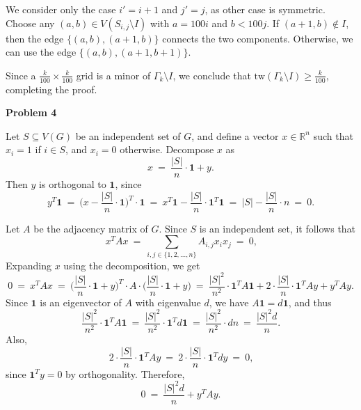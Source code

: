 \documentclass[12pt]{article}
\begin{document}
	We consider only the case \(i' = i + 1\) and \(j' = j\), as other case is
	symmetric. Choose any \((a, b) \in V(S_{i, j} \setminus I)\) with \(a = 100
	i\) and \(b < 100 j\). If \((a + 1, b) \notin I\), then the edge \(\{(a, b),
	(a + 1, b)\}\) connects the two components. Otherwise, we can use the edge
	\(\{(a, b), (a + 1, b + 1)\}\).
	
	\medskip
	
	Since a \(\frac{k}{100} \times \frac{k}{100}\) grid is a minor of
	\(\Gamma_{k} \setminus I\), we conclude that \(\mathrm{tw}(\Gamma_{k}
	\setminus I) \geqslant \frac{k}{100}\), completing the proof.
	
	\bigskip
	
	\textbf{Problem 4}
	
	\medskip
	
	Let \(S \subseteq V(G)\) be an independent set of \(G\), and define a vector
	\(x \in \mathbb{R}^{n}\) such that \(x_{i} = 1\) if \(i \in S\), and \(x_{i}
	= 0\) otherwise. Decompose \(x\) as
	\[
		x \ = \ \frac{|S|}{n} \cdot \mathbf{1} + y \text{.}
	\]
	Then \(y\) is orthogonal to \(\mathbf{1}\), since
	\[
		y^{T} \mathbf{1} \ = \ \bigg( x - \frac{|S|}{n} \cdot \mathbf{1}
		\bigg)^{T} \cdot \mathbf{1} \ = \ x^{T} \mathbf{1} - \frac{|S|}{n} \cdot
		\mathbf{1}^{T} \mathbf{1} \ = \ |S| - \frac{|S|}{n} \cdot n \ = \ 0
		\text{.}
	\]
	
	\medskip
	
	Let \(A\) be the adjacency matrix of \(G\). Since \(S\) is an independent
	set, it follows that
	\[
		x^{T} A x \ = \ \sum\limits_{i, j \in \{1, 2, \ldots, n\}} A_{i, j}
		x_{i} x_{j} \ = \ 0 \text{,}
	\]
	Expanding \(x\) using the decomposition, we get
	\[
		0 \ = \ x^{T} A x \ = \ \bigg( \frac{|S|}{n} \cdot \mathbf{1} + y
		\bigg)^{T} \cdot A \cdot \bigg( \frac{|S|}{n} \cdot \mathbf{1} + y
		\bigg) \ = \ \frac{|S|^{2}}{n^{2}} \cdot \mathbf{1}^{T} A \mathbf{1} + 2
		\cdot \frac{|S|}{n} \cdot \mathbf{1}^{T} A y + y^{T} A y \text{.}
	\]
	Since \(\mathbf{1}\) is an eigenvector of \(A\) with eigenvalue \(d\), we
	have \(A \mathbf{1} = d \mathbf{1}\), and thus
	\[
		\frac{|S|^{2}}{n^{2}} \cdot \mathbf{1}^{T} A \mathbf{1} \ = \
		\frac{|S|^{2}}{n^{2}} \cdot \mathbf{1}^{T} d \mathbf{1} \ = \
		\frac{|S|^{2}}{n^{2}} \cdot d n \ = \ \frac{|S|^{2} d}{n} \text{.}
	\]
	Also,
	\[
		2 \cdot \frac{|S|}{n} \cdot \mathbf{1}^{T} A y \ = \ 2 \cdot
		\frac{|S|}{n} \cdot \mathbf{1}^{T} d y \ = \ 0 \text{,}
	\]
	since \(\mathbf{1}^{T} y = 0\) by orthogonality. Therefore,
	\[
		0 \ = \ \frac{|S|^{2} d}{n} + y^{T} A y \text{.}
	\]
	
\end{document}
